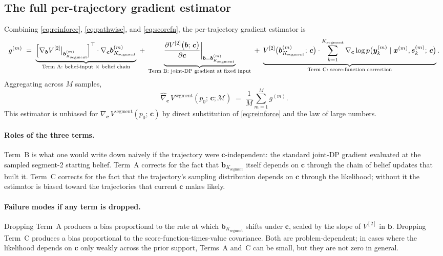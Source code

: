 \documentclass[11pt,a4paper]{article}
\newcommand{\bc}{\bm{c}}
\newcommand{\bx}{\bm{x}}
\newcommand{\by}{\bm{y}}
\newcommand{\bs}{\bm{s}}
\newcommand{\bb}{\bm{b}}
\begin{document}
\subsection{The full per-trajectory gradient estimator}
\label{sec:full_estimator}

Combining \eqref{eq:reinforce}, \eqref{eq:pathwise}, and \eqref{eq:scorefn}, the
per-trajectory gradient estimator is
\begin{equation}
g^{(m)}
\;=\;
\underbrace{\Bigl[\nabla_{\bb} V^{[2]}\bigr|_{\bb_{K_\mathrm{segment}}^{(m)}}\!\Bigr]^\top \cdot \nabla_{\bc} \bb_{K_\mathrm{segment}}^{(m)}}_{\text{Term A: belief-input × belief chain}}
\;+\;
\underbrace{\biggl.\frac{\partial V^{[2]}\bigl(\bb;\, \bc\bigr)}{\partial \bc}\biggr|_{\bb = \bb_{K_\mathrm{segment}}^{(m)}}}_{\text{Term B: joint-DP gradient at fixed input}}
\;+\;
\underbrace{V^{[2]}\bigl(\bb_{K_\mathrm{segment}}^{(m)};\, \bc\bigr) \cdot \sum_{k=1}^{K_\mathrm{segment}} \nabla_{\bc} \log p\bigl(\by_k^{(m)} \mid \bx^{(m)}, \bs_k^{(m)};\, \bc\bigr)}_{\text{Term C: score-function correction}}.
\label{eq:gm}
\end{equation}
Aggregating across $M$ samples,
\begin{equation}
\widehat{\nabla}_{\bc}\, V^\mathrm{segment}(p_0;\, \bc; \mathcal{M})
\;=\;
\frac{1}{M} \sum_{m=1}^{M} g^{(m)}.
\label{eq:full_estimator}
\end{equation}
This estimator is unbiased for $\nabla_{\bc}\, V^\mathrm{segment}(p_0;\, \bc)$ by direct
substitution of \eqref{eq:reinforce} and the law of large numbers.

\paragraph{Roles of the three terms.}  Term~B is what one would write down naively if the
trajectory were $\bc$-independent: the standard joint-DP gradient evaluated at the sampled
segment-2 starting belief.  Term~A corrects for the fact that $\bb_{K_\mathrm{segment}}$ itself
depends on $\bc$ through the chain of belief updates that built it.  Term~C corrects for
the fact that the trajectory's sampling distribution depends on $\bc$ through the
likelihood; without it the estimator is biased toward the trajectories that current $\bc$
makes likely.

\paragraph{Failure modes if any term is dropped.}  Dropping Term~A produces a bias
proportional to the rate at which $\bb_{K_\mathrm{segment}}$ shifts under $\bc$, scaled by
the slope of $V^{[2]}$ in $\bb$.  Dropping Term~C produces a bias proportional to the
score-function-times-value covariance.  Both are problem-dependent; in cases where the
likelihood depends on $\bc$ only weakly across the prior support, Terms~A and~C can be
small, but they are not zero in general.
\end{document}
